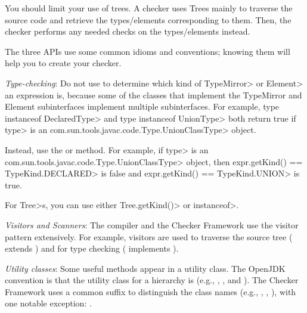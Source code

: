 You should limit your use of trees. A checker uses Trees mainly to
traverse the source code and retrieve the types/elements corresponding to
them.  Then, the checker performs any needed checks on the types/elements instead.



The three APIs use some common idioms and conventions; knowing them will
help you to create your checker.

\emph{Type-checking}:
Do not use  to determine which kind of \<TypeMirror> or \<Element> an expression is,
because some of the classes that implement the TypeMirror and Element subinterfaces implement multiple
subinterfaces. For example, \<type instanceof DeclaredType> and \<type instanceof UnionType>
both return true if \<type> is an \<com.sun.tools.javac.code.Type.UnionClassType> object.

Instead, use the
or
method.  For example, if \<type> is an \<com.sun.tools.javac.code.Type.UnionClassType> object, then
\<expr.getKind() == TypeKind.DECLARED> is false and \<expr.getKind() == TypeKind.UNION> is true.


For \<Tree>s, you can use either \<Tree.getKind()> or \<instanceof>.

\emph{Visitors and Scanners}:
The compiler and the Checker Framework use the visitor pattern
extensively. For example, visitors are used to traverse the source tree
( extends
) and for type
checking ( implements
).

\emph{Utility classes}:
Some useful methods appear in a utility class.  The OpenJDK convention is that
the utility class for a  hierarchy is  (e.g.,
, , and
).  The Checker Framework uses a common
 suffix to distinguish the class names (e.g., ,
, ), with one
notable exception: .




